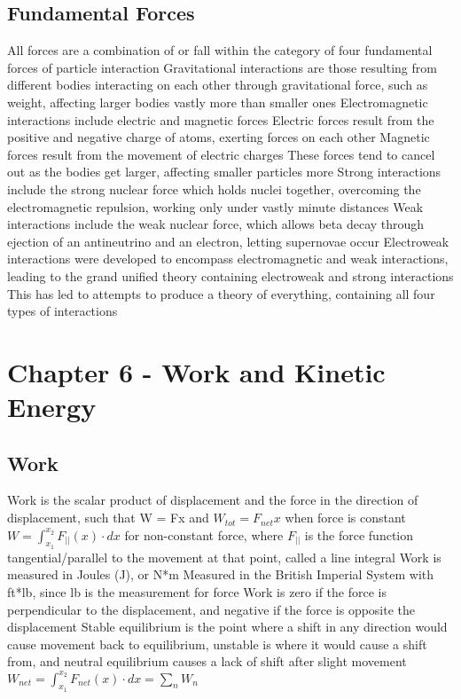 \documentclass[11 pt, twoside]{article}
\newenvironment{outline*}
{
	\begin{outline}[enumerate]
	}
	{\end{outline}
}
\begin{document}
\subsection{Fundamental Forces}
\begin{outline*}
\1 All forces are a combination of or fall within the category of four fundamental forces of particle interaction
\1 Gravitational interactions are those resulting from different bodies interacting on each other through gravitational force, such as weight, affecting larger bodies vastly more than smaller ones
\1 Electromagnetic interactions include electric and magnetic forces
\2 Electric forces result from the positive and negative charge of atoms, exerting forces on each other
\2 Magnetic forces result from the movement of electric charges
\2 These forces tend to cancel out as the bodies get larger, affecting smaller particles more
\1 Strong interactions include the strong nuclear force which holds nuclei together, overcoming the electromagnetic repulsion, working only under vastly minute distances
\1 Weak interactions include the weak nuclear force, which allows beta decay through ejection of an antineutrino and an electron, letting supernovae occur
\1 Electroweak interactions were developed to encompass electromagnetic and weak interactions, leading to the grand unified theory containing electroweak and strong interactions
\2 This has led to attempts to produce a theory of everything, containing all four types of interactions
\end{outline*}
\section{Chapter 6 - Work and Kinetic Energy}
\subsection{Work}
\begin{outline*}
\1 Work is the scalar product of displacement and the force in the direction of displacement, such that W = Fx and $W_{tot} = F_{net}x$ when force is constant
\2 $W = \int^{x_2}_{x_1} F_{||}(x) \cdot dx$ for non-constant force, where $F_{||}$ is the force function tangential/parallel to the movement at that point, called a line integral
\2 Work is measured in Joules (J), or N*m
\2 Measured in the British Imperial System with ft*lb, since lb is the measurement for force
\1 Work is zero if the force is perpendicular to the displacement, and negative if the force is opposite the displacement
\1 Stable equilibrium is the point where a shift in any direction would cause movement back to equilibrium, unstable is where it would cause a shift from, and neutral equilibrium causes a lack of shift after slight movement
\1 $W_{net} = \int^{x_2}_{x_1} F_{net}(x) \cdot dx = \sum_n W_n$
\end{outline*}
\end{document}
